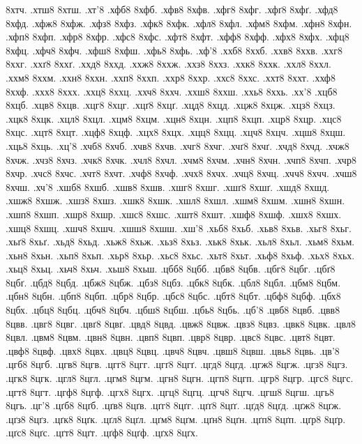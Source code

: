 {8хтч.
.хтш8
8хтш.
.хт'8
.хфб8
8хфб.
.хфв8
8хфв.
.хфг8
8хфг.
.хфґ8
8хфґ.
.хфд8
8хфд.
.хфж8
8хфж.
.хфз8
8хфз.
.хфк8
8хфк.
.хфл8
8хфл.
.хфм8
8хфм.
.хфн8
8хфн.
.хфп8
8хфп.
.хфр8
8хфр.
.хфс8
8хфс.
.хфт8
8хфт.
.хфф8
8хфф.
.хфх8
8хфх.
.хфц8
8хфц.
.хфч8
8хфч.
.хфш8
8хфш.
.хфь8
8хфь.
.хф'8
.ххб8
8ххб.
.ххв8
8ххв.
.ххг8
8ххг.
.ххґ8
8ххґ.
.ххд8
8ххд.
.ххж8
8ххж.
.ххз8
8ххз.
.ххк8
8ххк.
.ххл8
8ххл.
.ххм8
8ххм.
.ххн8
8ххн.
.ххп8
8ххп.
.ххр8
8ххр.
.ххс8
8ххс.
.ххт8
8ххт.
.ххф8
8ххф.
.ххх8
8ххх.
.ххц8
8ххц.
.ххч8
8ххч.
.ххш8
8ххш.
.ххь8
8ххь.
.хх'8
.хцб8
8хцб.
.хцв8
8хцв.
.хцг8
8хцг.
.хцґ8
8хцґ.
.хцд8
8хцд.
.хцж8
8хцж.
.хцз8
8хцз.
.хцк8
8хцк.
.хцл8
8хцл.
.хцм8
8хцм.
.хцн8
8хцн.
.хцп8
8хцп.
.хцр8
8хцр.
.хцс8
8хцс.
.хцт8
8хцт.
.хцф8
8хцф.
.хцх8
8хцх.
.хцц8
8хцц.
.хцч8
8хцч.
.хцш8
8хцш.
.хць8
8хць.
.хц'8
.хчб8
8хчб.
.хчв8
8хчв.
.хчг8
8хчг.
.хчґ8
8хчґ.
.хчд8
8хчд.
.хчж8
8хчж.
.хчз8
8хчз.
.хчк8
8хчк.
.хчл8
8хчл.
.хчм8
8хчм.
.хчн8
8хчн.
.хчп8
8хчп.
.хчр8
8хчр.
.хчс8
8хчс.
.хчт8
8хчт.
.хчф8
8хчф.
.хчх8
8хчх.
.хчц8
8хчц.
.хчч8
8хчч.
.хчш8
8хчш.
.хч'8
.хшб8
8хшб.
.хшв8
8хшв.
.хшг8
8хшг.
.хшґ8
8хшґ.
.хшд8
8хшд.
.хшж8
8хшж.
.хшз8
8хшз.
.хшк8
8хшк.
.хшл8
8хшл.
.хшм8
8хшм.
.хшн8
8хшн.
.хшп8
8хшп.
.хшр8
8хшр.
.хшс8
8хшс.
.хшт8
8хшт.
.хшф8
8хшф.
.хшх8
8хшх.
.хшц8
8хшц.
.хшч8
8хшч.
.хшш8
8хшш.
.хш'8
.хьб8
8хьб.
.хьв8
8хьв.
.хьг8
8хьг.
.хьґ8
8хьґ.
.хьд8
8хьд.
.хьж8
8хьж.
.хьз8
8хьз.
.хьк8
8хьк.
.хьл8
8хьл.
.хьм8
8хьм.
.хьн8
8хьн.
.хьп8
8хьп.
.хьр8
8хьр.
.хьс8
8хьс.
.хьт8
8хьт.
.хьф8
8хьф.
.хьх8
8хьх.
.хьц8
8хьц.
.хьч8
8хьч.
.хьш8
8хьш.
.цбб8
8цбб.
.цбв8
8цбв.
.цбг8
8цбг.
.цбґ8
8цбґ.
.цбд8
8цбд.
.цбж8
8цбж.
.цбз8
8цбз.
.цбк8
8цбк.
.цбл8
8цбл.
.цбм8
8цбм.
.цбн8
8цбн.
.цбп8
8цбп.
.цбр8
8цбр.
.цбс8
8цбс.
.цбт8
8цбт.
.цбф8
8цбф.
.цбх8
8цбх.
.цбц8
8цбц.
.цбч8
8цбч.
.цбш8
8цбш.
.цбь8
8цбь.
.цб'8
.цвб8
8цвб.
.цвв8
8цвв.
.цвг8
8цвг.
.цвґ8
8цвґ.
.цвд8
8цвд.
.цвж8
8цвж.
.цвз8
8цвз.
.цвк8
8цвк.
.цвл8
8цвл.
.цвм8
8цвм.
.цвн8
8цвн.
.цвп8
8цвп.
.цвр8
8цвр.
.цвс8
8цвс.
.цвт8
8цвт.
.цвф8
8цвф.
.цвх8
8цвх.
.цвц8
8цвц.
.цвч8
8цвч.
.цвш8
8цвш.
.цвь8
8цвь.
.цв'8
.цгб8
8цгб.
.цгв8
8цгв.
.цгг8
8цгг.
.цгґ8
8цгґ.
.цгд8
8цгд.
.цгж8
8цгж.
.цгз8
8цгз.
.цгк8
8цгк.
.цгл8
8цгл.
.цгм8
8цгм.
.цгн8
8цгн.
.цгп8
8цгп.
.цгр8
8цгр.
.цгс8
8цгс.
.цгт8
8цгт.
.цгф8
8цгф.
.цгх8
8цгх.
.цгц8
8цгц.
.цгч8
8цгч.
.цгш8
8цгш.
.цгь8
8цгь.
.цг'8
.цґб8
8цґб.
.цґв8
8цґв.
.цґг8
8цґг.
.цґґ8
8цґґ.
.цґд8
8цґд.
.цґж8
8цґж.
.цґз8
8цґз.
.цґк8
8цґк.
.цґл8
8цґл.
.цґм8
8цґм.
.цґн8
8цґн.
.цґп8
8цґп.
.цґр8
8цґр.
.цґс8
8цґс.
.цґт8
8цґт.
.цґф8
8цґф.
.цґх8
8цґх.
}
